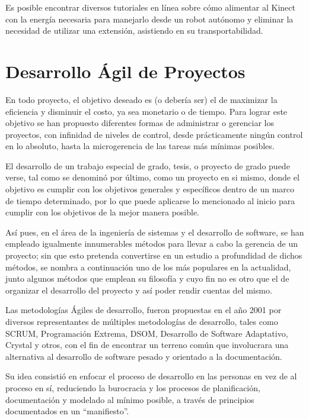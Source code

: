 Es posible encontrar diversos tutoriales en línea \cite{batterypoweredkinect} sobre cómo alimentar al Kinect con la energía necesaria para manejarlo desde un robot autónomo y eliminar la necesidad de utilizar una extensión, asistiendo en su transportabilidad.

\section{Desarrollo Ágil de Proyectos}

En todo proyecto, el objetivo deseado es (o debería ser) el de maximizar la eficiencia y disminuir el costo, ya sea monetario o de tiempo. Para lograr este objetivo se han propuesto diferentes formas de administrar o gerenciar los proyectos, con infinidad de niveles de control, desde prácticamente ningún control en lo absoluto, hasta la microgerencia de las tareas más mínimas posibles.

El desarrollo de un trabajo especial de grado, tesis, o proyecto de grado puede verse, tal como se denominó por último, como un proyecto en si mismo, donde el objetivo es cumplir con los objetivos generales y específicos dentro de un marco de tiempo determinado, por lo que puede aplicarse lo mencionado al inicio para cumplir con los objetivos de la mejor manera posible.

Así pues, en el área de la ingeniería de sistemas y el desarrollo de software, se han empleado igualmente innumerables métodos para llevar a cabo la gerencia de un proyecto; sin que esto pretenda convertirse en un estudio a profundidad de dichos métodos, se nombra a continuación uno de los más populares en la actualidad, junto algunos métodos que emplean su filosofía y cuyo fin no es otro que el de organizar el desarrollo del proyecto y así poder rendir cuentas del mismo.

Las metodologías Ágiles de desarrollo, fueron propuestas en el año 2001 por diversos representantes de múltiples metodologías de desarrollo, tales como SCRUM, Programación Extrema, DSOM, Desarrollo de Software Adaptativo, Crystal y otros, con el fin de encontrar un terreno común que involucrara una alternativa al desarrollo de software pesado y orientado a la documentación.

Su idea consistió en enfocar el proceso de desarrollo en las personas en vez de al proceso en sí, reduciendo la burocracia y los procesos de planificación, documentación y modelado al mínimo posible, a través de principios documentados en un ``manifiesto''.

